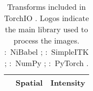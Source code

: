 \newcommand{\trsf}[2]{\texttt{#1}\textsuperscript{\textbf{#2}}}
\newcommand{\trsfl}[2]{\texttt{#1} \texttt{[image: \#2]}}

\begin{table}[ht]
    \caption[Transforms included in TorchIO \torchioversion]{
        Transforms included in TorchIO \torchioversion.
        Logos indicate the main library used to process the images.
        \protect{}:~NiBabel \cite{brett_nipynibabel_2020};
        \protect{}:~SimpleITK \cite{lowekamp_design_2013};
        \protect{}:~NumPy \cite{van_der_walt_numpy_2011};
        \protect{}:~PyTorch \cite{paszke_pytorch_2019}.
    }
    \footnotesize
    \begin{center}
        \begin{tabular}{@{}c | c c@{}}
        \toprule
                                                    & \textbf{Spatial}                      & \textbf{Intensity}                                                      \\

            \midrule


\end{tabular}
\end{center}
\end{table}
